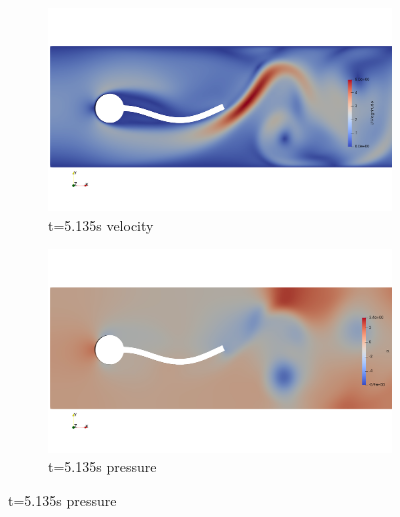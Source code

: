 \begin{figure}[htb]
\begin{subfigure}{0.5\textwidth}
  \includegraphics[width=\linewidth, trim=0 120 0 120, clip]{images/FSI2/fsi2_v2.png}
  \caption{t=5.135s velocity}
  \label{fig:fsi2_v2}
\end{subfigure}\hfil %
\begin{subfigure}{0.5\textwidth}
  \includegraphics[width=\linewidth, trim=0 120 0 120, clip]{images/FSI2/fsi2_p2.png}
  \caption{t=5.135s pressure}
  \label{fig:fsi2_p2}
\end{subfigure}\hfil %

\medskip


\end{figure}
